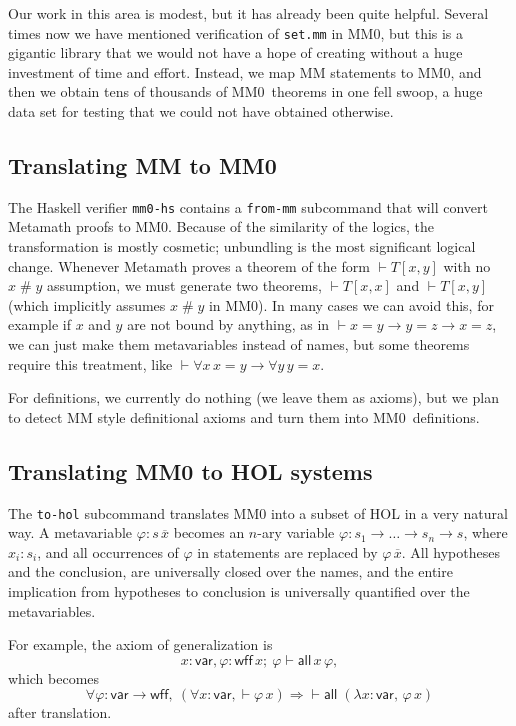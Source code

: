 \documentclass[runningheads]{llncs}
\newcommand{\mmO}{\textsf{MM0}}
\newcommand{\fresh}{\mathrel{\#}}
\begin{document}
Our work in this area is modest, but it has already been quite helpful. Several times now we have mentioned verification of \texttt{set.mm} in \mmO, but this is a gigantic library that we would not have a hope of creating without a huge investment of time and effort. Instead, we map \textsf{MM} statements to \mmO, and then we obtain tens of thousands of \mmO\ theorems in one fell swoop, a huge data set for testing that we could not have obtained otherwise.

\subsection{Translating MM to MM0}\label{sec:frommm}
The Haskell verifier \texttt{mm0-hs} contains a \texttt{from-mm} subcommand that will convert Metamath proofs to MM0. Because of the similarity of the logics, the transformation is mostly cosmetic; unbundling is the most significant logical change. Whenever Metamath proves a theorem of the form $\vdash T[x,y]$ with no $x\fresh y$ assumption, we must generate two theorems, $\vdash T[x,x]$ and $\vdash T[x,y]$ (which implicitly assumes $x\fresh y$ in \mmO). In many cases we can avoid this, for example if $x$ and $y$ are not bound by anything, as in $\vdash x=y\to y=z\to x=z$, we can just make them metavariables instead of names, but some theorems require this treatment, like $\vdash \forall x\,x=y\to \forall y\,y=x$.

For definitions, we currently do nothing (we leave them as axioms), but we plan to detect MM style definitional axioms and turn them into \mmO\ definitions.

\subsection{Translating MM0 to HOL systems}\label{sec:tohol}
The \texttt{to-hol} subcommand translates MM0 into a subset of HOL in a very natural way. A metavariable $\varphi:s\,\overline{x}$ becomes an $n$-ary variable $\varphi:s_1\to\dots \to s_n\to s$, where $x_i:s_i$, and all occurrences of $\varphi$ in statements are replaced by $\varphi\,\overline{x}$. All hypotheses and the conclusion, are universally closed over the names, and the entire implication from hypotheses to conclusion is universally quantified over the metavariables.

For example, the axiom of generalization is
$$x:\mathsf{var},\varphi:\mathsf{wff}\,x;\ \varphi\vdash \mathsf{all}\,x\,\varphi,$$
which becomes
$$\forall\varphi:\mathsf{var}\to\mathsf{wff},\ (\forall x:\mathsf{var}, \vdash \varphi\,x)\Rightarrow{{}\vdash{}} \mathsf{all}\;(\lambda x:\mathsf{var},\,\varphi\,x)$$
after translation.
\end{document}
